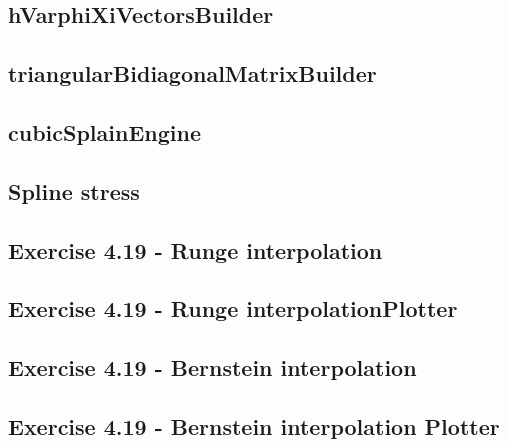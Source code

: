 \subsection{hVarphiXiVectorsBuilder}
\label{subsec:hVarphiXiVectorsBuilder}


\subsection{triangularBidiagonalMatrixBuilder}
\label{subsec:triangularBidiagonalMatrixBuilder}


\subsection{cubicSplainEngine}
\label{subsec:cubicSplainEngine}


\subsection{Spline stress}
\label{subsec:splineStress}


\subsection{Exercise 4.19 - Runge interpolation}
\label{subsec:exercise419RungeInterpolation}


\subsection{Exercise 4.19 - Runge interpolationPlotter}
\label{subsec:exercise419RungeInterpolationPlotter}


\subsection{Exercise 4.19 - Bernstein interpolation}
\label{subsec:exercise419BernsteinInterpolation}


\subsection{Exercise 4.19 - Bernstein interpolation Plotter}
\label{subsec:exercise419BernsteinInterpolationPlotter}


